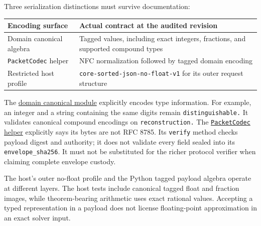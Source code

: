 \documentclass[
  11pt,
]{article}
\newcommand{\passthrough}[1]{#1}
\begin{document}
Three serialization distinctions must survive documentation:

\begin{longtable}[]{@{}
  >{\raggedright\arraybackslash}p{}
  >{\raggedright\arraybackslash}p{}@{}}
\toprule\noalign{}
\begin{minipage}[b]{\linewidth}\raggedright
Encoding surface
\end{minipage} & \begin{minipage}[b]{\linewidth}\raggedright
Actual contract at the audited revision
\end{minipage} \\
\midrule\noalign{}
\endhead
\bottomrule\noalign{}
\endlastfoot
Domain canonical algebra & Tagged values, including exact integers,
fractions, and supported compound types \\
\passthrough{\lstinline!PacketCodec!} helper & NFC normalization
followed by tagged domain encoding \\
Restricted host profile & \nolinkurl{core-sorted-json-no-float-v1} for
its outer request structure \\
\end{longtable}

The
\href{https://github.com/dbccpage/the_symbol_game/blob/52cb5457f6c485ba548cfd292f6012a941ed22cf/pfp/domain/shared_kernel/canonical.py}{domain
canonical module} explicitly encodes type information. For example, an
integer and a string containing the same digits remain
\nolinkurl{distinguishable.} It validates canonical compound encodings
on \nolinkurl{reconstruction.} The
\href{https://github.com/dbccpage/the_symbol_game/blob/52cb5457f6c485ba548cfd292f6012a941ed22cf/pfp/domain/packet_codec.py}{\passthrough{\lstinline!PacketCodec!}
helper} explicitly says its bytes are not RFC 8785. Its
\passthrough{\lstinline!verify!} method checks payload digest and
authority; it does not validate every field sealed into its
\nolinkurl{envelope_sha256}. It must not be substituted for the richer
protocol verifier when claiming complete envelope custody.

The host's outer no-float profile and the Python tagged payload algebra
operate at different layers. The host tests include canonical tagged
float and fraction images, while theorem-bearing arithmetic uses exact
rational values. Accepting a typed representation in a payload does not
license floating-point approximation in an exact solver input.
\end{document}

